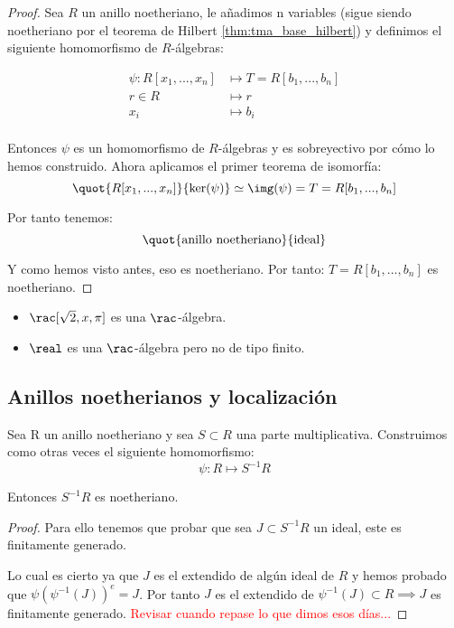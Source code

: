 \begin{proof}
	Sea $R$ un anillo noetheriano, le añadimos n variables (sigue siendo noetheriano por el teorema de Hilbert \ref{thm:tma_base_hilbert}) y definimos el siguiente homomorfismo de $R$-álgebras:

	\begin{align*}
		\psi: R[x_1,...,x_n] & \longmapsto  T=R[b_1,...,b_n]\\
		r \in R & \longmapsto r \\
		x_i & \longmapsto b_i \\
	\end{align*}

	Entonces $\psi$ es un homomorfismo de $R$-álgebras y es sobreyectivo por cómo lo hemos construido. Ahora aplicamos el primer teorema de isomorfía:
	$$ \quot{R[x_1,...,x_n]}{\ker(\psi)} \simeq \img(\psi)=T=R[b_1,...,b_n]$$

	Por tanto tenemos:
	 $$\quot{\text{anillo noetheriano}}{\text{ideal}}$$

	Y como hemos visto antes, eso es noetheriano. Por tanto: $T=R[b_1,...,b_n]$ es noetheriano.
\end{proof}

\begin{example}
	\begin{itemize}
		\item $\rac[\sqrt{2},x, \pi]$ es una $\rac$-álgebra.
		\item $\real$ es una $\rac$-álgebra pero no de tipo finito.
	\end{itemize}
\end{example}

\subsection{Anillos noetherianos y localización}

\begin{prop} \label{prop:NoetherianoLocalizacion}
	Sea R un anillo noetheriano y sea $S\subset R$ una parte multiplicativa. Construimos como otras veces el siguiente homomorfismo:
	$$\psi: R \longmapsto S^{-1}R$$

	Entonces $S^{-1}R$ es noetheriano.
\end{prop}
\begin{proof}
	Para ello tenemos que probar que sea $J \subset S^{-1}R$ un ideal, este es finitamente generado.

	Lo cual es cierto ya que $J$ es el extendido de algún ideal de $R$ y hemos probado que $\psi(\psi^{-1}(J))^e=J$. Por tanto $J$ es el extendido de $\psi^{-1}(J)\subset R \implies J$ es finitamente generado. \textcolor{red}{Revisar cuando repase lo que dimos esos días...} %
\end{proof}


